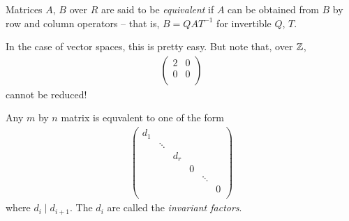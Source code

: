 \documentclass{../../template/note}
\begin{document}
    \begin{definition}
        Matrices $A$, $B$ over $R$ are said to be \emph{equivalent} if $A$ can be obtained from $B$ by row and column operators -- that is, $B=QAT^{-1}$ for invertible $Q$, $T$.
    \end{definition}
    
    \begin{remark*}
        In the case of vector spaces, this is pretty easy. But note that, over $\mathbb Z$,
        \begin{align*}
            \begin{pmatrix}
                2 & 0 \\
                0 & 0 \\
            \end{pmatrix}
        \end{align*}
        cannot be reduced!        
    \end{remark*}
    
    \begin{theorem}
        Any $m$ by $n$ matrix is equvalent to one of the form
        \begin{align*}
            \begin{pmatrix}
                d_1 &  &  &  &  & \\
                 & \ddots &  &  &  & \\
                 &  & d_r &  &  & \\
                 &  &  & 0 &  &  \\
                 &  &  &  & \ddots & \\
                 &  &  &  &  & 0 \\
            \end{pmatrix}
        \end{align*}
        where $d_i \mid d_{i+1}$. The $d_i$ are called the \emph{invariant factors}.
    \end{theorem}
    
\end{document}

